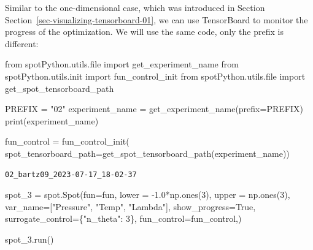 \documentclass[
  letterpaper,
  DIV=11,
  numbers=noendperiod]{scrreprt}
\newenvironment{Shaded}{\begin{snugshade}}{\end{snugshade}}
\newcommand{\BuiltInTok}[1]{\textcolor[rgb]{0.00,0.23,0.31}{#1}}
\newcommand{\DecValTok}[1]{\textcolor[rgb]{0.68,0.00,0.00}{#1}}
\newcommand{\FloatTok}[1]{\textcolor[rgb]{0.68,0.00,0.00}{#1}}
\newcommand{\ImportTok}[1]{\textcolor[rgb]{0.00,0.46,0.62}{#1}}
\newcommand{\NormalTok}[1]{\textcolor[rgb]{0.00,0.23,0.31}{#1}}
\newcommand{\OperatorTok}[1]{\textcolor[rgb]{0.37,0.37,0.37}{#1}}
\newcommand{\StringTok}[1]{\textcolor[rgb]{0.13,0.47,0.30}{#1}}
\newcommand{\VariableTok}[1]{\textcolor[rgb]{0.07,0.07,0.07}{#1}}
\begin{document}
\begin{tcolorbox}[enhanced jigsaw, left=2mm, title=\textcolor{quarto-callout-note-color}{\faInfo}\hspace{0.5em}{TensorBoard}, bottomrule=.15mm, titlerule=0mm, breakable, rightrule=.15mm, toprule=.15mm, coltitle=black, colbacktitle=quarto-callout-note-color!10!white, leftrule=.75mm, arc=.35mm, colframe=quarto-callout-note-color-frame, bottomtitle=1mm, colback=white, opacitybacktitle=0.6, toptitle=1mm, opacityback=0]

Similar to the one-dimensional case, which was introduced in Section
Section~\ref{sec-visualizing-tensorboard-01}, we can use TensorBoard to
monitor the progress of the optimization. We will use the same code,
only the prefix is different:

\begin{Shaded}
\begin{Highlighting}[]
\ImportTok{from}\NormalTok{ spotPython.utils.}\BuiltInTok{file} \ImportTok{import}\NormalTok{ get\_experiment\_name}
\ImportTok{from}\NormalTok{ spotPython.utils.init }\ImportTok{import}\NormalTok{ fun\_control\_init}
\ImportTok{from}\NormalTok{ spotPython.utils.}\BuiltInTok{file} \ImportTok{import}\NormalTok{ get\_spot\_tensorboard\_path}

\NormalTok{PREFIX }\OperatorTok{=} \StringTok{"02"}
\NormalTok{experiment\_name }\OperatorTok{=}\NormalTok{ get\_experiment\_name(prefix}\OperatorTok{=}\NormalTok{PREFIX)}
\BuiltInTok{print}\NormalTok{(experiment\_name)}

\NormalTok{fun\_control }\OperatorTok{=}\NormalTok{ fun\_control\_init(}
\NormalTok{    spot\_tensorboard\_path}\OperatorTok{=}\NormalTok{get\_spot\_tensorboard\_path(experiment\_name))}
\end{Highlighting}
\end{Shaded}

\begin{verbatim}
02_bartz09_2023-07-17_18-02-37
\end{verbatim}

\end{tcolorbox}

\begin{Shaded}
\begin{Highlighting}[]
\NormalTok{spot\_3 }\OperatorTok{=}\NormalTok{ spot.Spot(fun}\OperatorTok{=}\NormalTok{fun,}
\NormalTok{                   lower }\OperatorTok{=} \OperatorTok{{-}}\FloatTok{1.0}\OperatorTok{*}\NormalTok{np.ones(}\DecValTok{3}\NormalTok{),}
\NormalTok{                   upper }\OperatorTok{=}\NormalTok{ np.ones(}\DecValTok{3}\NormalTok{),}
\NormalTok{                   var\_name}\OperatorTok{=}\NormalTok{[}\StringTok{"Pressure"}\NormalTok{, }\StringTok{"Temp"}\NormalTok{, }\StringTok{"Lambda"}\NormalTok{],}
\NormalTok{                   show\_progress}\OperatorTok{=}\VariableTok{True}\NormalTok{,}
\NormalTok{                   surrogate\_control}\OperatorTok{=}\NormalTok{\{}\StringTok{"n\_theta"}\NormalTok{: }\DecValTok{3}\NormalTok{\},}
\NormalTok{                   fun\_control}\OperatorTok{=}\NormalTok{fun\_control,)}

\NormalTok{spot\_3.run()}
\end{Highlighting}
\end{Shaded}
\end{document}
